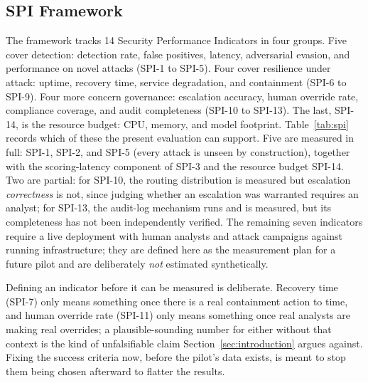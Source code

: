 \documentclass[sigconf,review,anonymous]{acmart}
\begin{document}
\subsection{SPI Framework}
The framework tracks 14 Security Performance Indicators in four groups. Five cover detection: detection rate, false positives, latency, adversarial evasion, and performance on novel attacks (SPI-1 to SPI-5). Four cover resilience under attack: uptime, recovery time, service degradation, and containment (SPI-6 to SPI-9). Four more concern governance: escalation accuracy, human override rate, compliance coverage, and audit completeness (SPI-10 to SPI-13). The last, SPI-14, is the resource budget: CPU, memory, and model footprint. Table~\ref{tab:spi} records which of these the present evaluation can support. Five are measured in full: SPI-1, SPI-2, and SPI-5 (every attack is unseen by construction), together with the scoring-latency component of SPI-3 and the resource budget SPI-14. Two are partial: for SPI-10, the routing distribution is measured but escalation \emph{correctness} is not, since judging whether an escalation was warranted requires an analyst; for SPI-13, the audit-log mechanism runs and is measured, but its completeness has not been independently verified. The remaining seven indicators require a live deployment with human analysts and attack campaigns against running infrastructure; they are defined here as the measurement plan for a future pilot and are deliberately \emph{not} estimated synthetically.

Defining an indicator before it can be measured is deliberate. Recovery time (SPI-7) only means something once there is a real containment action to time, and human override rate (SPI-11) only means something once real analysts are making real overrides; a plausible-sounding number for either without that context is the kind of unfalsifiable claim Section~\ref{sec:introduction} argues against. Fixing the success criteria now, before the pilot's data exists, is meant to stop them being chosen afterward to flatter the results.
\end{document}
